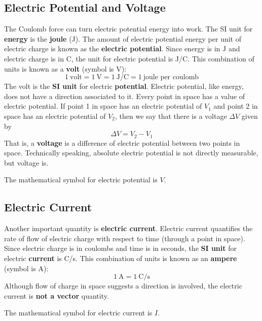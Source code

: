 \subsection{Electric Potential and Voltage}
%
The Coulomb force can turn electric potential energy into work. The SI unit for \textbf{energy} is the \textbf{joule} (J). The amount of electric potential energy per unit of electric charge is known as the \textbf{electric potential}. Since energy is in J and electric charge is in C, the unit for electric potential is J/C. This combination of units is known as a \textbf{volt} (symbol is V):
\begin{equation}
	1 \ \text{volt} = 1 \ \text{V} = 1 \ \text{J/C} = 1 \ \text{joule per coulomb}
\end{equation}
The volt is the \textbf{SI unit} for electric \textbf{potential}. Electric potential, like energy, does not have a direction associated to it. Every point in space has a value of electric potential. If point 1 in space has an electric potential of $V_{1}$ and point 2 in space has an electric potential of $V_{2}$, then we say that there is a voltage $\Delta V$ given by
\begin{equation}
	\Delta V = V_{2} - V_{1}
\end{equation}
That is, a \textbf{voltage} is a difference of electric potential between two points in space. Technically speaking, absolute electric potential is not directly measurable, but voltage is.

The mathematical symbol for electric potential is $V$.
%
\subsection{Electric Current}
%
Another important quantity is \textbf{electric current}. Electric current quantifies the rate of flow of electric charge with respect to time (through a point in space). Since electric charge is in coulombs and time is in seconds, the \textbf{SI unit} for electric \textbf{current} is C/s. This combination of units is known as an \textbf{ampere} (symbol is A):
\begin{equation}
	1 \ \text{A} = 1 \ \text{C/s}
\end{equation}
Although flow of charge in space suggests a direction is involved, the electric current is \textbf{not a vector} quantity.

The mathematical symbol for electric current is $I$.
%
